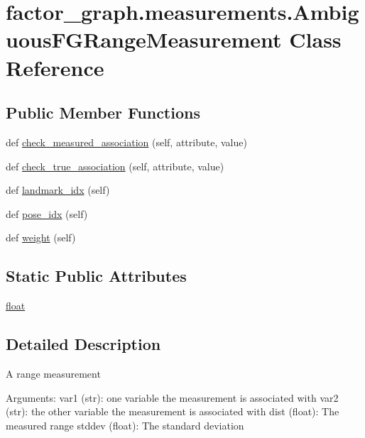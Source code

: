 \hypertarget{classfactor__graph_1_1measurements_1_1AmbiguousFGRangeMeasurement}{}\section{factor\+\_\+graph.\+measurements.\+Ambiguous\+F\+G\+Range\+Measurement Class Reference}
\label{classfactor__graph_1_1measurements_1_1AmbiguousFGRangeMeasurement}
\subsection*{Public Member Functions}
\begin{DoxyCompactItemize}
\item
def \hyperlink{classfactor__graph_1_1measurements_1_1AmbiguousFGRangeMeasurement_ac46e29923ac4fe98afe5bed43a9e3501}{check\+\_\+measured\+\_\+association} (self, attribute, value)
\item
def \hyperlink{classfactor__graph_1_1measurements_1_1AmbiguousFGRangeMeasurement_abfb4c09377760ca2c686c1ec9ba8a473}{check\+\_\+true\+\_\+association} (self, attribute, value)
\item
def \hyperlink{classfactor__graph_1_1measurements_1_1AmbiguousFGRangeMeasurement_a9c75db6e3eb2778223792af0aa222715}{landmark\+\_\+idx} (self)
\item
def \hyperlink{classfactor__graph_1_1measurements_1_1AmbiguousFGRangeMeasurement_aa80af606ff237600a6f609c46bcc04cf}{pose\+\_\+idx} (self)
\item
def \hyperlink{classfactor__graph_1_1measurements_1_1AmbiguousFGRangeMeasurement_a3e63dcfa839865d8e3209b9b106afd41}{weight} (self)
\end{DoxyCompactItemize}
\subsection*{Static Public Attributes}
\begin{DoxyCompactItemize}
\item
\hyperlink{classfactor__graph_1_1measurements_1_1AmbiguousFGRangeMeasurement_ad3644bfd743c770a2e54b621b8c86b08}{float}
\end{DoxyCompactItemize}


\subsection{Detailed Description}
\begin{DoxyVerb}A range measurement

Arguments:
    var1 (str): one variable the measurement is associated with
    var2 (str): the other variable the measurement is associated with
    dist (float): The measured range
    stddev (float): The standard deviation
\end{DoxyVerb}


